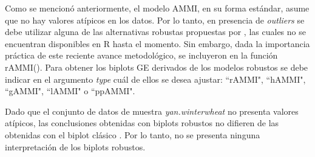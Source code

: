 

Como se mencionó anteriormente, el modelo AMMI, en su forma estándar, asume que no hay valores atípicos en los datos. Por lo tanto, en presencia de \emph{outliers} se debe utilizar alguna de las alternativas robustas propuestas por \citet{Rodriguesetal2016}, las cuales no se encuentran disponibles en R hasta el momento. Sin embargo, dada la importancia práctica de este reciente avance metodológico, se incluyeron en la función \textcolor{fandango}{rAMMI()}. Para obtener los biplots GE derivados de los modelos robustos se debe indicar en el argumento \emph{type} cuál de ellos se desea ajustar: ``rAMMI", ``hAMMI", ``gAMMI", ``lAMMI" o ``ppAMMI".

Dado que el conjunto de datos de muestra \emph{yan.winterwheat} no presenta valores atípicos, las conclusiones obtenidas con biplots robustos no difieren de las obtenidas con el biplot clásico \citep{Rodriguesetal2016}. Por lo tanto, no se presenta ninguna interpretación de los biplots robustos. 


